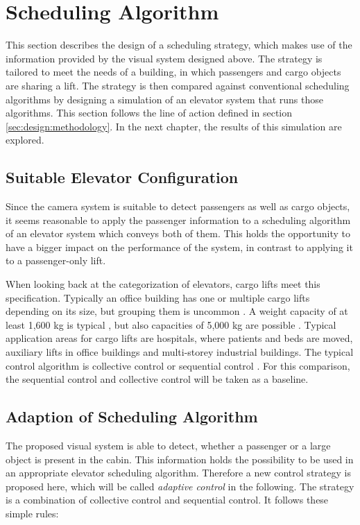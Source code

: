 \section{Scheduling Algorithm}
\label{sec:design:schedulingalgorithm}
This section describes the design of a scheduling strategy, 
which makes use of the information provided by the visual system designed above.
The strategy is tailored to meet the needs of a building, in which passengers and cargo objects are sharing a lift.
The strategy is then compared against conventional scheduling algorithms by designing a simulation of an elevator system that runs those algorithms.
This section follows the line of action defined in section \ref{sec:design:methodology}.
In the next chapter, the results of this simulation are explored.

\subsection{Suitable Elevator Configuration}
Since the camera system is suitable to detect passengers as well as cargo objects,
it seems reasonable to apply the passenger information 
to a scheduling algorithm of an elevator system which conveys both of them.
This holds the opportunity to have a bigger impact on the performance of the system, 
in contrast to applying it to a passenger-only lift.

When looking back at the categorization of elevators, cargo lifts meet this specification.
Typically an office building has one or multiple cargo lifts depending on its size,
but grouping them is uncommon \autocite[][p.~167]{barney2016handbook}.
A weight capacity of at least 1,600 kg is typical \autocite[][p.~167]{barney2016handbook},
but also capacities of 5,000 kg are possible \autocite[][]{kone2017overview}.
Typical application areas for cargo lifts are hospitals, where patients and beds are moved,
auxiliary lifts in office buildings and multi-storey industrial buildings.
The typical control algorithm is collective control or sequential control \autocite[][pp.~238,~244]{barney2016handbook}.
For this comparison, the sequential control and collective control will be taken as a baseline.

\subsection{Adaption of Scheduling Algorithm}
The proposed visual system is able to detect, whether a passenger or a large object is present in the cabin.
This information holds the possibility to be used in an appropriate elevator scheduling algorithm.
Therefore a new control strategy is proposed here, which will be called \emph{adaptive control} in the following. 
The strategy is a combination of collective control and sequential control.
It follows these simple rules:

